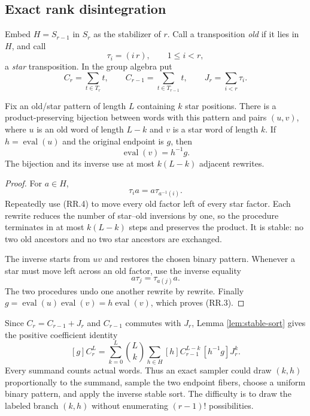 \subsection{Exact rank disintegration}

Embed $H=S_{r-1}$ in $S_r$ as the stabilizer of $r$.  Call a transposition
\emph{old} if it lies in $H$, and call
\[
  \tau_i=(i\,r),\qquad 1\le i<r,
\]
a \emph{star} transposition.  In the group algebra put
\[
  C_r=\sum_{t\in T_r}t,\qquad
  C_{r-1}=\sum_{t\in T_{r-1}}t,\qquad
  J_r=\sum_{i<r}\tau_i.
\]

\begin{lemma}
\label{lem:stable-sort}
Fix an old/star pattern of length $L$ containing $k$ star positions.  There is
a product-preserving bijection between words with this pattern and pairs
$(u,v)$, where $u$ is an old word of length $L-k$ and $v$ is a star word of
length $k$.  If $h=\operatorname{eval}(u)$ and the original endpoint is $g$,
then
\[
  \operatorname{eval}(v)=h^{-1}g.
  \tag{RR.3}
\]
The bijection and its inverse use at most $k(L-k)$ adjacent rewrites.
\end{lemma}

\begin{proof}
For $a\in H$,
\[
  \tau_i a=a\tau_{a^{-1}(i)}.
  \tag{RR.4}
\]
Repeatedly use (RR.4) to move every old factor left of every star factor.
Each rewrite reduces the number of star--old inversions by one, so the
procedure terminates in at most $k(L-k)$ steps and preserves the product.
It is stable: no two old ancestors and no two star ancestors are exchanged.

The inverse starts from $uv$ and restores the chosen binary pattern.  Whenever
a star must move left across an old factor, use the inverse equality
\[
  a\tau_j=\tau_{a(j)}a.
\]
The two procedures undo one another rewrite by rewrite.  Finally
$g=\operatorname{eval}(u)\operatorname{eval}(v)=h\operatorname{eval}(v)$,
which proves (RR.3).
\end{proof}

Since $C_r=C_{r-1}+J_r$ and $C_{r-1}$ commutes with $J_r$, Lemma
\ref{lem:stable-sort} gives the positive coefficient identity
\[
  [g]C_r^L
  =
  \sum_{k=0}^L\binom{L}{k}
  \sum_{h\in H}
    [h]C_{r-1}^{L-k}\,[h^{-1}g]J_r^k.
  \tag{RR.5}
\]
Every summand counts actual words.  Thus an exact sampler could draw $(k,h)$
proportionally to the summand, sample the two endpoint fibers, choose a
uniform binary pattern, and apply the inverse stable sort.  The difficulty is
to draw the labeled branch $(k,h)$ without enumerating $(r-1)!$ possibilities.

